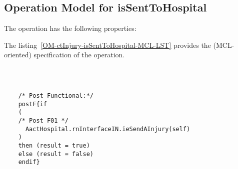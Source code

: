 \subsection{Operation Model for isSentToHospital}

\label{OM-isSentToHospital}


The  operation has the following properties:

	\begin{operationmodel}



		


	\end{operationmodel}



	\vspace{1cm}
	The listing~\ref{OM-ctInjury-isSentToHospital-MCL-LST} provides the \msrmessir (MCL-oriented) specification of the operation.
	
	\scriptsize
	\vspace{0.5cm}
	\begin{lstlisting}[style=MessirStyle,firstnumber=auto,captionpos=b,caption={\msrmessir (MCL-oriented) specification of the operation \emph{isSentToHospital}.},label=OM-ctInjury-isSentToHospital-MCL-LST]

	
	
	/* Post Functional:*/ 
	postF{if 
	(
	/* Post F01 */
	  AactHospital.rnInterfaceIN.ieSendAInjury(self)
	)
	then (result = true)
	else (result = false)
	endif}
	
	
	\end{lstlisting}
	\normalsize 
	
	
	
	





